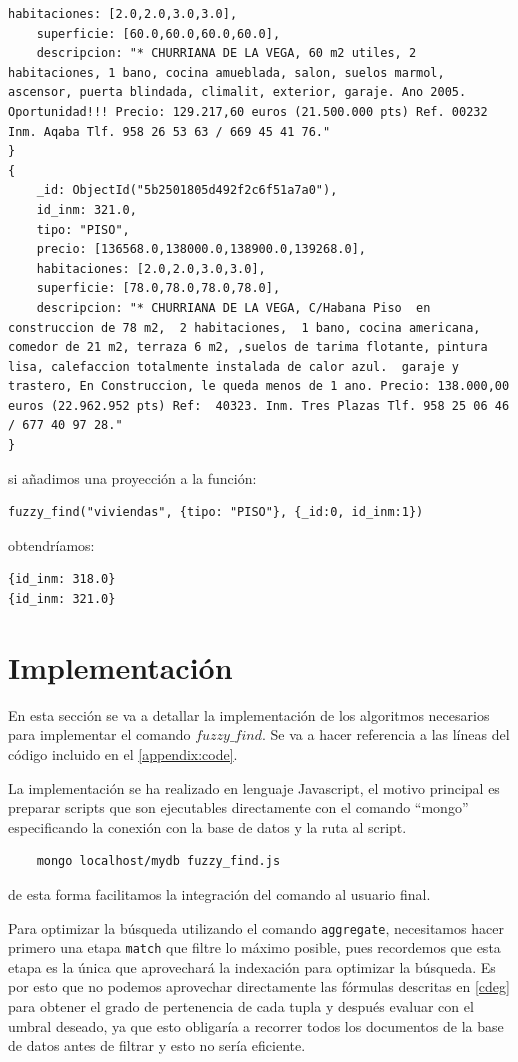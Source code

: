 \begin{example}
\begin{lstlisting}[numbers=none]
    habitaciones: [2.0,2.0,3.0,3.0],
    superficie: [60.0,60.0,60.0,60.0],
    descripcion: "* CHURRIANA DE LA VEGA, 60 m2 utiles, 2 habitaciones, 1 bano, cocina amueblada, salon, suelos marmol, ascensor, puerta blindada, climalit, exterior, garaje. Ano 2005. Oportunidad!!! Precio: 129.217,60 euros (21.500.000 pts) Ref. 00232 Inm. Aqaba Tlf. 958 26 53 63 / 669 45 41 76."
}
{
    _id: ObjectId("5b2501805d492f2c6f51a7a0"),
    id_inm: 321.0,
    tipo: "PISO",
    precio: [136568.0,138000.0,138900.0,139268.0],
    habitaciones: [2.0,2.0,3.0,3.0],
    superficie: [78.0,78.0,78.0,78.0],
    descripcion: "* CHURRIANA DE LA VEGA, C/Habana Piso  en construccion de 78 m2,  2 habitaciones,  1 bano, cocina americana, comedor de 21 m2, terraza 6 m2, ,suelos de tarima flotante, pintura lisa, calefaccion totalmente instalada de calor azul.  garaje y trastero, En Construccion, le queda menos de 1 ano. Precio: 138.000,00 euros (22.962.952 pts) Ref:  40323. Inm. Tres Plazas Tlf. 958 25 06 46 / 677 40 97 28."
}
\end{lstlisting}
%
si añadimos una proyección a la función:
%
\begin{verbatim}
fuzzy_find("viviendas", {tipo: "PISO"}, {_id:0, id_inm:1})
\end{verbatim}
%
obtendríamos:
%
\begin{lstlisting}[numbers=none]
{id_inm: 318.0}
{id_inm: 321.0}
\end{lstlisting}

\end{example}

\section{Implementación}

En esta sección se va a detallar la implementación de los algoritmos necesarios para implementar el comando $fuzzy\_find$. Se va a hacer referencia a las líneas del código incluido en el \autoref{appendix:code}.

La implementación se ha realizado en lenguaje Javascript, el motivo principal es preparar scripts que son ejecutables directamente con el comando ``mongo'' especificando la conexión con la base de datos y la ruta al script.
%
\begin{verbatim}
    mongo localhost/mydb fuzzy_find.js
\end{verbatim}
%
de esta forma facilitamos la integración del comando al usuario final.

Para optimizar la búsqueda utilizando el comando \texttt{aggregate}, necesitamos hacer primero una etapa \texttt{match} que filtre lo máximo posible, pues recordemos que esta etapa es la única que aprovechará la indexación para optimizar la búsqueda. Es por esto que no podemos aprovechar directamente las fórmulas descritas en \ref{cdeg} para obtener el grado de pertenencia de cada tupla y después evaluar con el umbral deseado, ya que esto obligaría a recorrer todos los documentos de la base de datos antes de filtrar y esto no sería eficiente. 

